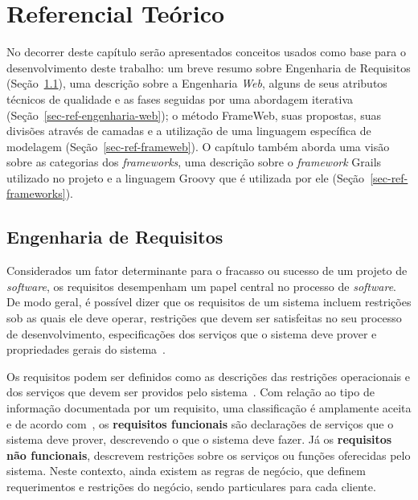 \chapter{Referencial Teórico}
\label{sec-referencial}

No decorrer deste capítulo serão apresentados conceitos usados como base para o desenvolvimento deste trabalho: um breve resumo sobre Engenharia de Requisitos (Seção~\ref{sec-ref-engenharia-requisitos}), uma descrição sobre a Engenharia \textit{Web}, alguns de seus atributos técnicos de qualidade e as fases seguidas por uma abordagem iterativa (Seção~\ref{sec-ref-engenharia-web}); o método FrameWeb, suas propostas, suas divisões através de camadas e a utilização de uma linguagem específica de modelagem (Seção~\ref{sec-ref-frameweb}). O capítulo também aborda uma visão sobre as categorias dos \textit{frameworks}, uma descrição sobre o \textit{framework} Grails utilizado no projeto e a linguagem Groovy que é utilizada por ele (Seção~\ref{sec-ref-frameworks}).


\section{Engenharia de Requisitos}
\label{sec-ref-engenharia-requisitos}

Considerados um fator determinante para o fracasso ou sucesso de um projeto de \textit{software}, os requisitos desempenham um papel central no processo de \textit{software}. De modo geral, é possível dizer que os requisitos de um sistema incluem restrições sob as quais ele deve operar, restrições que devem ser satisfeitas no seu processo de desenvolvimento, especificações dos serviços que o sistema deve prover e propriedades gerais do sistema~\cite{falbo:er17}.

Os requisitos podem ser definidos como as descrições das restrições operacionais e dos serviços que devem ser providos pelo sistema~\cite{sommerville:es07}. Com relação ao tipo de informação documentada por um requisito, uma classificação é amplamente aceita e de acordo com~, os \textbf{requisitos funcionais} são declarações de serviços que o sistema deve prover, descrevendo o que o sistema deve fazer. Já os \textbf{requisitos não funcionais}, descrevem restrições sobre os serviços ou funções oferecidas pelo sistema. Neste contexto, ainda existem as regras de negócio, que definem requerimentos e restrições do negócio, sendo particulares para cada cliente.

